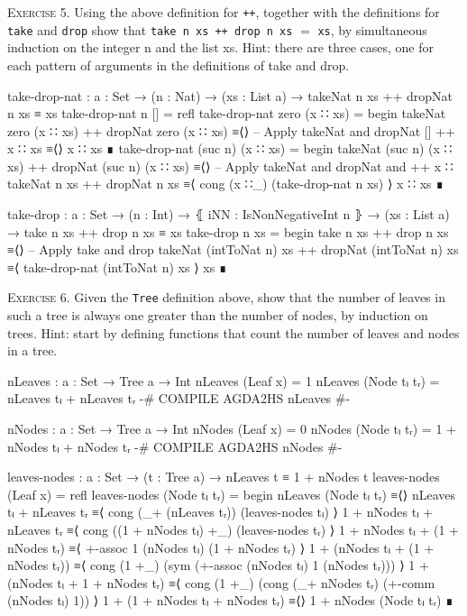 \documentclass{article}
\begin{document}
\noindent
\textsc{Exercise 5.} Using the above definition for \texttt{++}, together with the definitions for \texttt{take} and \texttt{drop} show that \verb!take n xs ++ drop n xs! $=$ \verb!xs!, by simultaneous induction on the integer n and the list xs. Hint: there are three cases, one for each pattern of arguments in the definitions of take and drop.

\begin{code}
take-drop-nat : {a : Set} → (n : Nat) → (xs : List a)
    → takeNat n xs ++ dropNat n xs ≡ xs
take-drop-nat n [] = refl
take-drop-nat zero (x ∷ xs) =
  begin
    takeNat zero (x ∷ xs) ++ dropNat zero (x ∷ xs)
  ≡⟨⟩ -- Apply takeNat and dropNat
    [] ++ x ∷ xs
  ≡⟨⟩
    x ∷ xs
  ∎
take-drop-nat (suc n) (x ∷ xs) =
  begin
    takeNat (suc n) (x ∷ xs) ++ dropNat (suc n) (x ∷ xs)
  ≡⟨⟩ -- Apply takeNat and dropNat and ++
    x ∷ takeNat n xs ++ dropNat n xs
  ≡⟨ cong (x ∷_) (take-drop-nat n xs) ⟩
    x ∷ xs
  ∎
\end{code}
\begin{code}
take-drop : {a : Set} → (n : Int) → ⦃ iNN : IsNonNegativeInt n ⦄
    → (xs : List a) → take n xs ++ drop n xs ≡ xs
take-drop n xs =
  begin
    take n xs ++ drop n xs
  ≡⟨⟩ -- Apply take and drop
    takeNat (intToNat n) xs ++ dropNat (intToNat n) xs
  ≡⟨ take-drop-nat (intToNat n) xs ⟩
    xs
  ∎
\end{code}

\noindent
\textsc{Exercise 6.} Given the \texttt{Tree} definition above, show that the number of leaves in such a tree is always one greater than the number of nodes, by induction on trees. Hint: start by defining functions that count the number of leaves and nodes in a tree.

\begin{code}
nLeaves : {a : Set} → Tree a → Int
nLeaves (Leaf x) = 1
nLeaves (Node tₗ tᵣ) = nLeaves tₗ + nLeaves tᵣ
{-# COMPILE AGDA2HS nLeaves #-}
\end{code}
\begin{code}
nNodes : {a : Set} → Tree a → Int
nNodes (Leaf x) = 0
nNodes (Node tₗ tᵣ) = 1 + nNodes tₗ + nNodes tᵣ
{-# COMPILE AGDA2HS nNodes #-}
\end{code}
\begin{code}
leaves-nodes : {a : Set} → (t : Tree a) → nLeaves t ≡ 1 + nNodes t
leaves-nodes (Leaf x) = refl
leaves-nodes (Node tₗ tᵣ) =
  begin
    nLeaves (Node tₗ tᵣ)
  ≡⟨⟩
    nLeaves tₗ + nLeaves tᵣ
  ≡⟨ cong (_+ (nLeaves tᵣ)) (leaves-nodes tₗ) ⟩
    1 + nNodes tₗ + nLeaves tᵣ
  ≡⟨ cong ((1 + nNodes tₗ) +_) (leaves-nodes tᵣ) ⟩
    1 + nNodes tₗ + (1 + nNodes tᵣ)
  ≡⟨ +-assoc 1 (nNodes tₗ) (1 + nNodes tᵣ) ⟩
    1 + (nNodes tₗ + (1 + nNodes tᵣ))
  ≡⟨ cong (1 +_) (sym (+-assoc (nNodes tₗ) 1 (nNodes tᵣ))) ⟩
    1 + (nNodes tₗ + 1 + nNodes tᵣ)
  ≡⟨ cong (1 +_) (cong (_+ nNodes tᵣ) (+-comm (nNodes tₗ) 1)) ⟩
    1 + (1 + nNodes tₗ + nNodes tᵣ)
  ≡⟨⟩
    1 + nNodes (Node tₗ tᵣ)
  ∎
\end{code}
\end{document}
